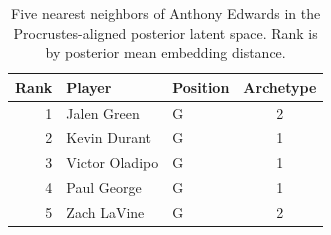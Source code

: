 \begin{table}[htbp]
  \centering\small
  \begin{tabular}{rllc}
    \toprule
    Rank & Player & Position & Archetype \\
    \midrule
    1 & Jalen Green & G & 2 \\
    2 & Kevin Durant & G & 1 \\
    3 & Victor Oladipo & G & 1 \\
    4 & Paul George & G & 1 \\
    5 & Zach LaVine & G & 2 \\
    \bottomrule
  \end{tabular}
  \caption{Five nearest neighbors of Anthony Edwards in the Procrustes-aligned posterior latent space. Rank is by posterior mean embedding distance.}
  \label{tab:Anthony_Edwards_neighbors}
\end{table}

